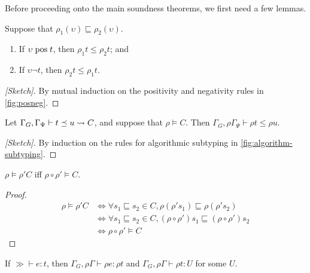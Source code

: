 Before proceeding onto the main soundness theorems, we first need a few lemmas.

\begin{lemma}\label{lem:posneg}
Suppose that $\rho_1(\upsilon) \sqsubseteq \rho_2(\upsilon)$.
\begin{enumerate}
  \item If $\upsilon \mathrel{\text{pos}} t$, then $\rho_1 t \leq \rho_2 t$; and
  \item If $\upsilon \neg t$, then $\rho_2 t \leq \rho_1 t$.
\end{enumerate}
\end{lemma}

\begin{proof}[{[Sketch]}]
By mutual induction on the positivity and negativity rules in \autoref{fig:posneg}.
\end{proof}

\begin{lemma}\label{lem:subtyping}
Let $\Gamma_G, \Gamma_{\Psi} \vdash t \preceq u \rightsquigarrow C$,
and suppose that $\rho \vDash C$.
Then $\Gamma_G, \rho \Gamma_{\Psi} \vdash \rho t \leq \rho u$.
\end{lemma}

\begin{proof}[{[Sketch]}]
By induction on the rules for algorithmic subtyping in \autoref{fig:algorithm-subtyping}.
\end{proof}

\iffalse
\begin{lemma}\label{lem:constraint-subst}
$\rho \vDash \rho' C$ iff $\rho \circ \rho' \vDash C$.
\end{lemma}

\begin{proof}
\begin{align*}
  \rho \vDash \rho' C
  &\Leftrightarrow \forall s_1 \sqsubseteq s_2 \in C, \rho (\rho' s_1) \sqsubseteq \rho (\rho' s_2) \\
  &\Leftrightarrow \forall s_1 \sqsubseteq s_2 \in C, (\rho \circ \rho') s_1 \sqsubseteq (\rho \circ \rho') s_2 \\
  &\Leftrightarrow \rho \circ \rho' \vDash C
\end{align*}
\end{proof}

\begin{lemma}\label{lem:typing-subst}
  If $\gg \vdash e : t$, then $\Gamma_G, \rho \Gamma \vdash \rho e : \rho t$ and $\Gamma_G, \rho \Gamma \vdash \rho t : U$ for some $U$.
\end{lemma}

